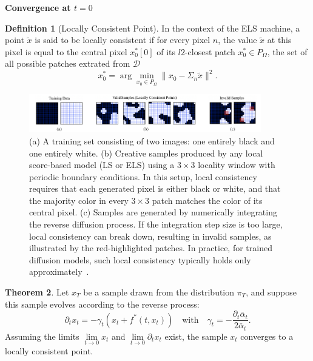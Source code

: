 \documentclass[a4paper,10pt]{article}
\theoremstyle{definition} %
\newtheorem{definition}{Definition}[section]
\theoremstyle{definition} %
\theoremstyle{definition} %
\newtheorem{theorem}[definition]{Theorem}
\theoremstyle{definition} %
\newcommand{\0}{\boldsymbol{0}}
\begin{document}
\noindent
{\textbf{Convergence at $t = 0$}}
\begin{definition}[Locally Consistent Point]
    In the context of the ELS machine, a point $\tilde{x}$ is said to be locally consistent if 
    for every pixel $n$, the value $\tilde{x}$ at this pixel is equal to the central pixel $x_0^*[0]$ of its $l2$-closest patch $x_0^* \in P_\Omega$, the set of all possible patches extrated from $\mathcal{D}$
    \[
        x_0^* = \arg \min_{x_0 \in P_{\Omega}} \|x_0 - \Sigma_n \tilde{x}\|^2.
    \]
\end{definition}
\begin{figure}[h] %
    \centering
    \includegraphics[width=0.9\textwidth]{../images/locally_consistent_point.png} %
\caption{
(a) A training set consisting of two images: one entirely black and one entirely white. 
(b) Creative samples produced by any local score-based model (LS or ELS) using a \(3 \times 3\) locality window with periodic boundary conditions. In this setup, local consistency requires that each generated pixel is either black or white, and that the majority color in every \(3 \times 3\) patch matches the color of its central pixel. 
(c) Samples are generated by numerically integrating the reverse diffusion process. If the integration step size is too large, local consistency can break down, resulting in invalid samples, as illustrated by the red-highlighted patches. In practice, for trained diffusion models, such local consistency typically holds only approximately~\cite{kamb2024analytictheorycreativityconvolutional}.
}   
\label{fig:local_consistency}
\end{figure}

\begin{theorem}
    Let \(x_T\) be a sample drawn from the distribution \(\pi_T\), and suppose this sample evolves according to the reverse process:
    \[
        \partial_t x_t = - \gamma_t \left( x_t + f^*(t,x_t) \right) \quad \text{with} \quad \gamma_t = -\frac{\partial_t \bar{\alpha}_t}{2 \bar \alpha_t}.
    \]
    Assuming the limits \( \lim\limits_{t \to 0} x_t \) and \( \lim\limits_{t \to 0} \partial_t x_t \) exist, the sample \( x_t \) converges to a locally consistent point.
\end{theorem}
\end{document}
